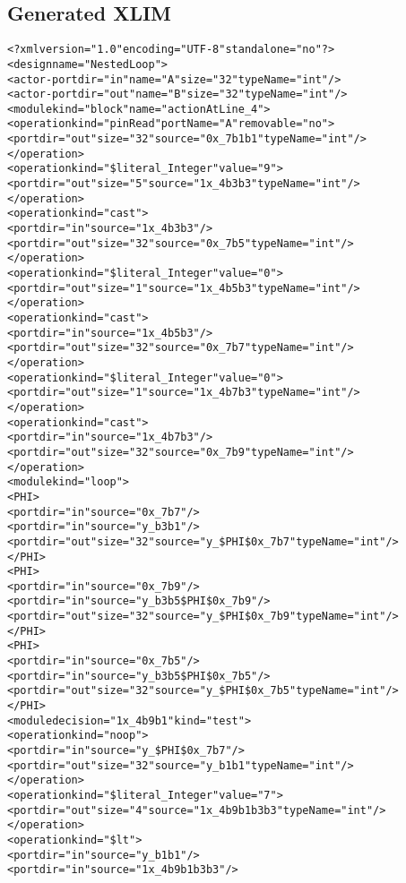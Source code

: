 \subsection{Generated XLIM}
\begin{alltt}
<?xml version="1.0" encoding="UTF-8" standalone="no"?>
<design name="NestedLoop">
  <actor-port dir="in" name="A" size="32" typeName="int"/>
  <actor-port dir="out" name="B" size="32" typeName="int"/>
  <module kind="block" name="actionAtLine\_4">
    <operation kind="pinRead" portName="A" removable="no">
      <port dir="out" size="32" source="0x\_7b1b1" typeName="int"/>
    </operation>
    <operation kind="\$literal\_Integer" value="9">
      <port dir="out" size="5" source="1x\_4b3b3" typeName="int"/>
    </operation>
    <operation kind="cast">
      <port dir="in" source="1x\_4b3b3"/>
      <port dir="out" size="32" source="0x\_7b5" typeName="int"/>
    </operation>
    <operation kind="\$literal\_Integer" value="0">
      <port dir="out" size="1" source="1x\_4b5b3" typeName="int"/>
    </operation>
    <operation kind="cast">
      <port dir="in" source="1x\_4b5b3"/>
      <port dir="out" size="32" source="0x\_7b7" typeName="int"/>
    </operation>
    <operation kind="\$literal\_Integer" value="0">
      <port dir="out" size="1" source="1x\_4b7b3" typeName="int"/>
    </operation>
    <operation kind="cast">
      <port dir="in" source="1x\_4b7b3"/>
      <port dir="out" size="32" source="0x\_7b9" typeName="int"/>
    </operation>
    <module kind="loop">
      <PHI>
        <port dir="in" source="0x\_7b7"/>
        <port dir="in" source="y\_b3b1"/>
        <port dir="out" size="32" source="y\_\$PHI\$0x\_7b7" typeName="int"/>
      </PHI>
      <PHI>
        <port dir="in" source="0x\_7b9"/>
        <port dir="in" source="y\_b3b5\$PHI\$0x\_7b9"/>
        <port dir="out" size="32" source="y\_\$PHI\$0x\_7b9" typeName="int"/>
      </PHI>
      <PHI>
        <port dir="in" source="0x\_7b5"/>
        <port dir="in" source="y\_b3b5\$PHI\$0x\_7b5"/>
        <port dir="out" size="32" source="y\_\$PHI\$0x\_7b5" typeName="int"/>
      </PHI>
      <module decision="1x\_4b9b1" kind="test">
        <operation kind="noop">
          <port dir="in" source="y\_\$PHI\$0x\_7b7"/>
          <port dir="out" size="32" source="y\_b1b1" typeName="int"/>
        </operation>
        <operation kind="\$literal\_Integer" value="7">
          <port dir="out" size="4" source="1x\_4b9b1b3b3" typeName="int"/>
        </operation>
        <operation kind="\$lt">
          <port dir="in" source="y\_b1b1"/>
          <port dir="in" source="1x\_4b9b1b3b3"/>

\end{alltt}
